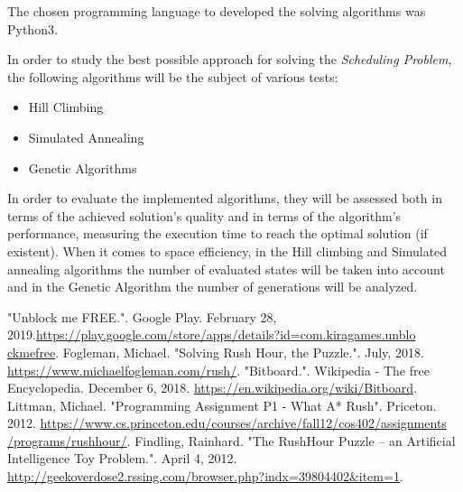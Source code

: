 \documentclass[conference]{IEEEtran}
\begin{document}
The chosen programming language to developed the solving algorithms was Python3.

In order to study the best possible approach for solving the \textit{Scheduling Problem}, the following algorithms will be the subject of various tests:
\begin{itemize}
    \item Hill Climbing
    \item Simulated Annealing
    \item Genetic Algorithms
\end{itemize}

In order to evaluate the implemented algorithms, they will be assessed both in terms of the achieved solution's quality and in terms of the algorithm's performance, measuring the execution time to reach the optimal solution (if existent). When it comes to space efficiency, in the Hill climbing and Simulated annealing algorithms the number of evaluated states will be taken into account and in the Genetic Algorithm the number of generations will be analyzed.

\begin{thebibliography}{00}
    
 "Unblock me FREE.". Google Play. February 28, 2019.\href{https://play.google.com/store/apps/details?id=com.kiragames.unblockmefree}{https://play.google.com/store/apps/details?id=com.kiragames.unblo\\ckmefree}.
 Fogleman, Michael. "Solving Rush Hour, the Puzzle.". July, 2018. \href{https://www.michaelfogleman.com/rush/}{https://www.michaelfogleman.com/rush/}.
 "Bitboard.". Wikipedia - The free Encyclopedia. December 6, 2018. \href{https://en.wikipedia.org/wiki/Bitboard}{https://en.wikipedia.org/wiki/Bitboard}.
 Littman, Michael. "Programming Assignment P1 - What A* Rush". Priceton. 2012. \href{https://www.cs.princeton.edu/courses/archive/fall12/cos402/assignments/programs/rushhour/}{https://www.cs.princeton.edu/courses/archive/fall12/cos402/assignments\\/programs/rushhour/}.
 Findling, Rainhard. "The RushHour Puzzle – an Artificial Intelligence Toy Problem.". April 4, 2012. \href{http://geekoverdose2.rssing.com/browser.php?indx=39804402\&item=1}{http://geekoverdose2.rssing.com/browser.php?indx=39804402\&item=1}.

\end{thebibliography}
\end{document}
